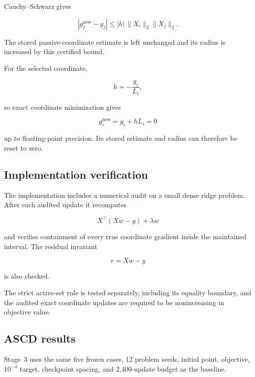 \documentclass[11pt]{article}
\begin{document}
Cauchy--Schwarz gives

\begin{equation}
|g_j^{\mathrm{new}}-g_j|
\le
|h|\,\|X_i\|_2\|X_j\|_2.
\label{eq:zero-oracle-radius}
\end{equation}

The stored passive-coordinate estimate is left unchanged and its radius
is increased by this certified bound.

For the selected coordinate,

\[
h=-\frac{g_i}{L_i},
\]

so exact coordinate minimization gives

\[
g_i^{\mathrm{new}}
=
g_i+hL_i
=
0
\]

up to floating-point precision. Its stored estimate and radius can
therefore be reset to zero.


\subsection{Implementation verification}

The implementation includes a numerical audit on a small dense ridge
problem. After each audited update it recomputes

\[
X^\top(Xw-y)+\lambda w
\]

and verifies containment of every true coordinate gradient inside the
maintained interval. The residual invariant

\[
r=Xw-y
\]

is also checked.

The strict active-set rule is tested separately, including its equality
boundary, and the audited exact coordinate updates are required to be
nonincreasing in objective value.


\subsection{ASCD results}

Stage~3 uses the same five frozen cases, 12 problem seeds, initial point,
objective, $10^{-4}$ target, checkpoint spacing, and 2,400-update budget
as the baseline.
\end{document}
